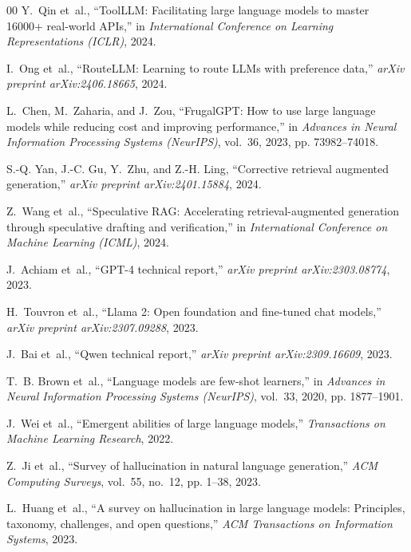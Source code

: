 \documentclass[journal,10pt,twocolumn]{IEEEtran}
\begin{document}
\begin{thebibliography}{00}
Y.~Qin et~al., ``Tool{LLM}: Facilitating large language models to master 16000+ real-world {APIs},'' in \textit{International Conference on Learning Representations (ICLR)}, 2024.

I.~Ong et~al., ``Route{LLM}: Learning to route {LLMs} with preference data,'' \textit{arXiv preprint arXiv:2406.18665}, 2024.

L.~Chen, M.~Zaharia, and J.~Zou, ``Frugal{GPT}: How to use large language models while reducing cost and improving performance,'' in \textit{Advances in Neural Information Processing Systems (NeurIPS)}, vol.~36, 2023, pp. 73982--74018.

S.-Q. Yan, J.-C. Gu, Y.~Zhu, and Z.-H. Ling, ``Corrective retrieval augmented generation,'' \textit{arXiv preprint arXiv:2401.15884}, 2024.

Z.~Wang et~al., ``Speculative {RAG}: Accelerating retrieval-augmented generation through speculative drafting and verification,'' in \textit{International Conference on Machine Learning (ICML)}, 2024.

J.~Achiam et~al., ``{GPT-4} technical report,'' \textit{arXiv preprint arXiv:2303.08774}, 2023.

H.~Touvron et~al., ``Llama 2: Open foundation and fine-tuned chat models,'' \textit{arXiv preprint arXiv:2307.09288}, 2023.

J.~Bai et~al., ``Qwen technical report,'' \textit{arXiv preprint arXiv:2309.16609}, 2023.

T.~B. Brown et~al., ``Language models are few-shot learners,'' in \textit{Advances in Neural Information Processing Systems (NeurIPS)}, vol.~33, 2020, pp. 1877--1901.

J.~Wei et~al., ``Emergent abilities of large language models,'' \textit{Transactions on Machine Learning Research}, 2022.

Z.~Ji et~al., ``Survey of hallucination in natural language generation,'' \textit{ACM Computing Surveys}, vol.~55, no.~12, pp. 1--38, 2023.

L.~Huang et~al., ``A survey on hallucination in large language models: Principles, taxonomy, challenges, and open questions,'' \textit{ACM Transactions on Information Systems}, 2023.


\end{thebibliography}
\end{document}
